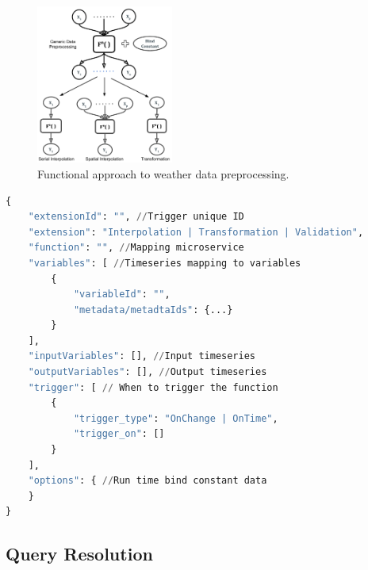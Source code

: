 \documentclass[conference]{IEEEtran}
\begin{document}
\begin{figure}[t!]
\centerline{\includegraphics[width=0.4\textwidth]{images/summary_weather_data_preprocessing_p1.pdf}}
\caption{Functional approach to weather data preprocessing.}
\label{pfi:summary_weather_data_preprocessing}
\end{figure}


\begin{lstlisting}[language=Python, caption=Format of a request made to update an extension., label=pli:extension_triggers]
{
    "extensionId": "", //Trigger unique ID
    "extension": "Interpolation | Transformation | Validation",
    "function": "", //Mapping microservice
    "variables": [ //Timeseries mapping to variables
        {
            "variableId": "",
            "metadata/metadtaIds": {...}
        }
    ],
    "inputVariables": [], //Input timeseries
    "outputVariables": [], //Output timeseries
    "trigger": [ // When to trigger the function
        {
            "trigger_type": "OnChange | OnTime",
            "trigger_on": []
        }
    ],
    "options": { //Run time bind constant data
    }
}
\end{lstlisting}



\subsection{Query Resolution}
\label{psubse:query_timeseries}
\end{document}
